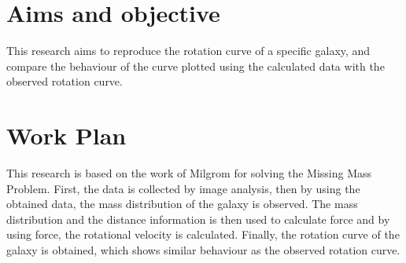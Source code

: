 \section{Aims and objective}
This research aims to reproduce the rotation curve of a specific galaxy, and compare the behaviour of the curve plotted using the calculated data with the observed rotation curve.

\section{Work Plan}
 This research is based on the work of Milgrom for solving the Missing Mass Problem. First, the data is collected by image analysis, then by using the obtained data, the mass distribution of the galaxy is observed. The mass distribution and the distance information is then used to calculate force and by using force, the rotational velocity is calculated. Finally, the rotation curve of the galaxy is obtained, which shows similar behaviour as the observed rotation curve. 
